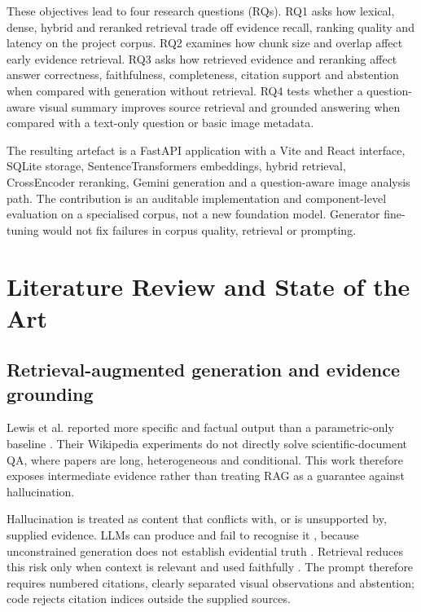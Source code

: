 \documentclass[11pt,a4paper]{article}
\begin{document}
These objectives lead to four research questions (RQs). RQ1 asks how lexical, dense, hybrid and reranked retrieval trade off evidence recall, ranking quality and latency on the project corpus. RQ2 examines how chunk size and overlap affect early evidence retrieval. RQ3 asks how retrieved evidence and reranking affect answer correctness, faithfulness, completeness, citation support and abstention when compared with generation without retrieval. RQ4 tests whether a question-aware visual summary improves source retrieval and grounded answering when compared with a text-only question or basic image metadata.

The resulting artefact is a FastAPI application with a Vite and React interface, SQLite storage, SentenceTransformers embeddings, hybrid retrieval, CrossEncoder reranking, Gemini generation and a question-aware image analysis path. The contribution is an auditable implementation and component-level evaluation on a specialised corpus, not a new foundation model. Generator fine-tuning would not fix failures in corpus quality, retrieval or prompting.

\FloatBarrier
\section{Literature Review and State of the Art}
\label{sec:literature-review-and-state-of-the-art}

\subsection{Retrieval-augmented generation and evidence grounding}
\label{sec:retrieval-augmented-generation-and-evidence-grounding}

Lewis et al. reported more specific and factual output than a parametric-only baseline \cite{lewis2020rag}. Their Wikipedia experiments do not directly solve scientific-document QA, where papers are long, heterogeneous and conditional. This work therefore exposes intermediate evidence rather than treating RAG as a guarantee against hallucination.

Hallucination is treated as content that conflicts with, or is unsupported by, supplied evidence. LLMs can produce and fail to recognise it \cite{li2023halueval}, because unconstrained generation does not establish evidential truth \cite{bouyamourn2023hallucinate}. Retrieval reduces this risk only when context is relevant and used faithfully \cite{es2024ragas}. The prompt therefore requires numbered citations, clearly separated visual observations and abstention; code rejects citation indices outside the supplied sources.
\end{document}

